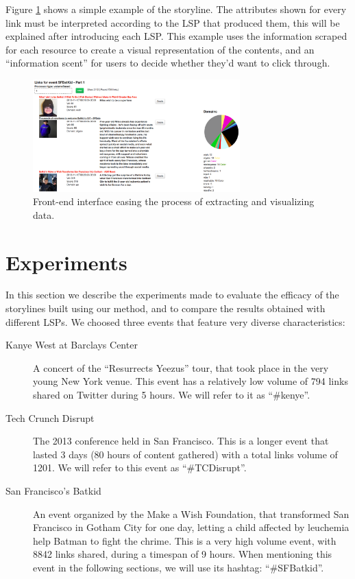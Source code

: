 \documentclass{sig-alternate}
\begin{document}
Figure \ref{fig:javascript_interface} shows a simple example of the storyline. The attributes shown for every link must be interpreted according to the LSP that produced them, this will be explained after introducing each LSP. This example uses the information scraped for each resource to create a visual representation of the contents, and an ``information scent'' for users to decide whether they'd want to click through. %
\begin{figure}[htbp]
  \centering
  \includegraphics[width=8cm]{Figures/javascript_interface.png}
  \caption{Front-end interface easing the process of extracting and visualizing data.}
  \label{fig:javascript_interface}
\end{figure}


\section{Experiments}
\label{sec:experiment}
In this section we describe the experiments made to evaluate the efficacy of the storylines built using our method, and to compare the results obtained with different LSPs. We choosed three events that feature very diverse characteristics:
\begin{description}
\item[Kanye West at Barclays Center] A concert of the ``Resurrects Yeezus'' tour, that took place in the very young New York venue. This event has a relatively low volume of 794 links shared on Twitter during 5 hours. We will refer to it as ``\#kenye''.
\item[Tech Crunch Disrupt] The 2013 conference held in San Francisco. This is a longer event that lasted 3 days (80 hours of content gathered) with a total links volume of 1201. We will refer to this event as ``\#TCDisrupt''.
\item[San Francisco's Batkid] An event organized by the Make a Wish Foundation, that transformed San Francisco in Gotham City for one day, letting a child affected by leuchemia help Batman to fight the chrime. This is a very high volume event, with 8842 links shared, during a timespan of 9 hours. When mentioning this event in the following sections, we will use its hashtag: ``\#SFBatkid''.
\end{description}
\end{document}
